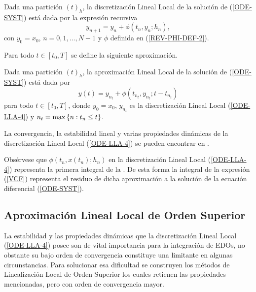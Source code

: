 \begin{definition}
	\label{definition LLD} Dada una partición $(t)_{h}$, la discretización Lineal Local de la solución de (\ref{ODE-SYST}) está dada por la expresión recursiva
	\begin{equation}
	y_{n+1}=y_{n}+\phi \left( t_{n},y_{n};h_{n}\right) ,  \label{ODE-LLA-4}
	\end{equation}%
	con $y_{0}=x_{0}$, $n=0,1,\ldots,N-1$ y $\phi$ definida en (\ref{REV-PHI-DEF-2}).
\end{definition}

Para todo $t\in[t_{0},T]$ se define la siguiente aproximación.
\begin{definition}
	\label{definition LLA} Dada una partición $(t)_{h}$, la aproximación
	Lineal Local de la solución de (\ref{ODE-SYST}) está dada por 
	\begin{equation}
	y(t)=y_{n_{t}}+\phi(t_{n_{t}},y_{n_{t}};t-t_{n_{t}})
	\label{ODE-REV-FORM-LLA}
	\end{equation}
	para todo $t\in[t_{0},T]$, donde $y_{0}=x_{0}$, $y_{n_{t}}$ es la discretización Lineal Local (\ref{ODE-LLA-4}) y ${n_{t}=\max\left\{ n:t_{n}\leq t \right\}}$.
\end{definition}

 La convergencia, la estabilidad lineal y varias propiedades dinámicas de  la discretización Lineal Local (\ref{ODE-LLA-4}) se pueden encontrar en \cite{Jimenez02AMC}. 
 
 Obsérvese que $\phi(t_{n},x(t_n);h_n)$ en la discretización Lineal Local (\ref{ODE-LLA-4}) representa la primera integral de la . De esta forma la integral de la expresión (\ref{VCF}) representa el residuo de dicha aproximación a la solución de la ecuación diferencial (\ref{ODE-SYST}).
\subsection{Aproximación Lineal Local de Orden Superior}

La estabilidad y las propiedades dinámicas que la discretización Lineal Local (\ref{ODE-LLA-4}) posee son de vital importancia para la integración de EDOs, no obstante su bajo orden de convergencia constituye una limitante en algunas circunstancias. Para solucionar esa dificultad se construyen los métodos de Linealización Local de Orden Superior los cuales retienen las propiedades mencionadas, pero con orden de convergencia mayor. 

